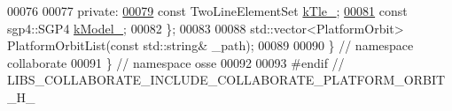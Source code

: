\begin{DoxyCode}
00076 
00077  \textcolor{keyword}{private}:
\hyperlink{classosse_1_1collaborate_1_1_platform_orbit_a997543f1020cfa000918286b774c4aa8}{00079}   \textcolor{keyword}{const} TwoLineElementSet \hyperlink{classosse_1_1collaborate_1_1_platform_orbit_a997543f1020cfa000918286b774c4aa8}{kTle\_};
\hyperlink{classosse_1_1collaborate_1_1_platform_orbit_a5653e1ae6b7a6274f0ecfdb423b25606}{00081}   \textcolor{keyword}{const} sgp4::SGP4 \hyperlink{classosse_1_1collaborate_1_1_platform_orbit_a5653e1ae6b7a6274f0ecfdb423b25606}{kModel\_};
00082 \};
00083 
00088 std::vector<PlatformOrbit> PlatformOrbitList(\textcolor{keyword}{const} std::string& \_path);
00089 
00090 \}  \textcolor{comment}{// namespace collaborate}
00091 \}  \textcolor{comment}{// namespace osse}
00092 
00093 \textcolor{preprocessor}{#endif  // LIBS\_COLLABORATE\_INCLUDE\_COLLABORATE\_PLATFORM\_ORBIT\_H\_}
\end{DoxyCode}
